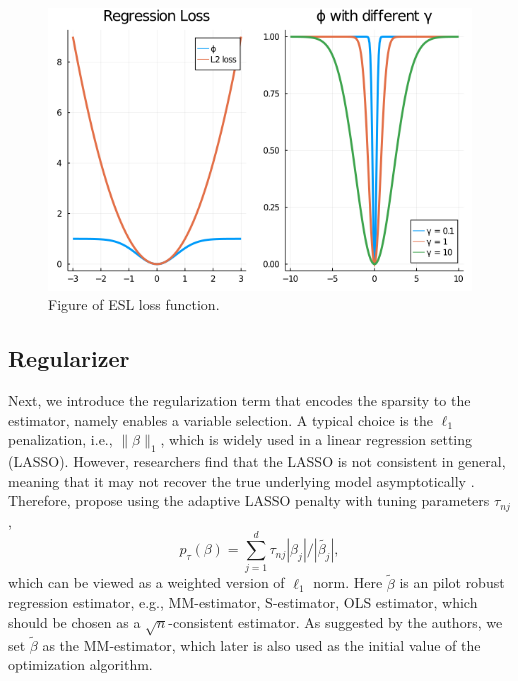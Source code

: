 \begin{figure}[H]
    \centering
    \includegraphics[width = 0.8\linewidth]{figures/esl.png}
    \caption{Figure of ESL loss function.}
    \label{fig:esl}
\end{figure}






\subsection{Regularizer} \label{sec:pnty}
Next, we introduce the regularization term that encodes the sparsity to the estimator, namely enables a variable selection. A typical choice is the $\ell_1$ penalization, i.e., $\|\beta\|_1$, which is widely used in a linear regression setting (LASSO). However, researchers find that the LASSO is not consistent in general, meaning that it may not recover the true underlying model asymptotically \citep{zhao2006model}. Therefore, \citet{wang2013robust} propose using the adaptive LASSO penalty \citep{zou2006adaptive} with tuning parameters $\tau_{nj}$, 
\[
p_{\tau}(\beta) = \sum_{j=1}^d \tau_{nj}|\beta_j|/|\tilde{\beta_j}|,   
\]
which can be viewed as a weighted version of $\ell_1$ norm.
Here $\tilde{\beta}$ is an pilot robust regression estimator, e.g., MM-estimator, S-estimator, OLS estimator, which should be chosen as a $\sqrt{n}$-consistent estimator. As suggested by the authors, we set $\tilde \beta$ as the MM-estimator, which later is also used as the initial value of the optimization algorithm. 



